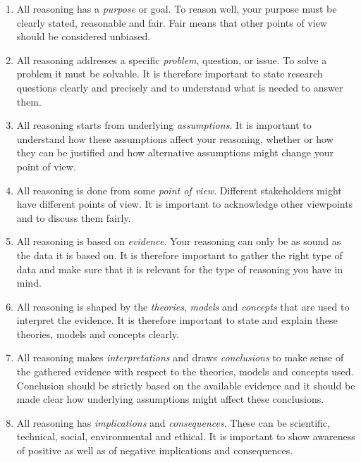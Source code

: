 \documentclass[a4paper,12pt]{book}
\begin{document}
\begin{enumerate}
    \item All reasoning has a \emph{purpose} or goal. To reason well,
your purpose must be clearly stated, reasonable and fair.
Fair means that other points of view should be considered unbiased.

    \item All reasoning addresses a specific \emph{problem}, question, or issue.
To solve a problem it must be solvable. It is therefore important to
state research questions clearly and precisely and to understand what
is needed to answer them.

    \item All reasoning starts from underlying \emph{assumptions}. It is
important to understand how these assumptions affect your reasoning,
whether or how they can be justified and how alternative assumptions
might change your point of view.

    \item All reasoning is done from some \emph{point of view}. Different stakeholders
might have different points of view. It is important to acknowledge other
viewpoints and to discuss them fairly.

    \item All reasoning is based on \emph{evidence}. Your reasoning can only be
as sound as the data it is based on. It is therefore important to
gather the right type of data and make sure that it is relevant for
the type of reasoning you have in mind.  

    \item All reasoning is shaped by the \emph{theories}, \emph{models} and \emph{concepts}
that are used to interpret the evidence. It is therefore important to
state and explain these theories, models and concepts clearly.

    \item All reasoning makes \emph{interpretations} and draws \emph{conclusions} to make
sense of the gathered evidence with respect to the theories, models and
concepts used. Conclusion should be strictly based on the available
evidence and it should be made clear how underlying assumptions
might affect these conclusions.

    \item All reasoning has \emph{implications} and \emph{consequences}. These can be
scientific, technical, social, environmental and ethical. It is important
to show awareness of positive as well as of negative implications and
consequences.
\end{enumerate}
\end{document}
